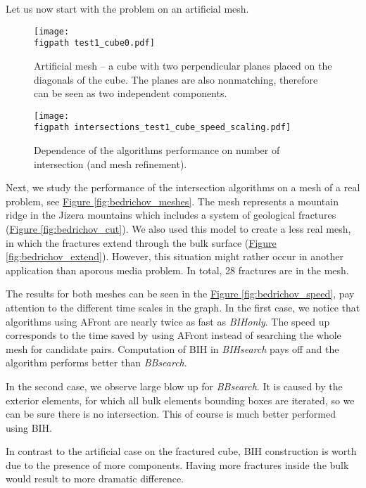 \documentclass{elsarticle}
\newcommand{\fig}[1]{\hyperref[#1]{Figure \ref{#1}}}
\newcommand{\figpath}{figures/}
\begin{document}
Let us now start with the problem on an artificial mesh. 

\begin{figure}[!htb]
    \centering
    \texttt{[image: \\figpath test1\_cube0.pdf]}
    \caption{Artificial mesh -- a cube with two perpendicular planes placed on the diagonals of the cube.
             The planes are also nonmatching, therefore can be seen as two independent components.}
    \label{fig:cube_mesh}
\end{figure}
  
\begin{figure}[!htb]
    \centering
    \texttt{[image: \\figpath intersections\_test1\_cube\_speed\_scaling.pdf]}
    \caption{Dependence of the algorithms performance on number of intersection (and mesh refinement). }
    \label{fig:cube_speed}
\end{figure}


Next, we study the performance of the intersection algorithms on a mesh of a real problem, see \fig{fig:bedrichov_meshes}. The mesh represents a mountain ridge in the Jizera mountains which 
includes a system of geological fractures (\fig{fig:bedrichov_cut}). We also used this model to create
a less real mesh, in which the fractures extend through the bulk surface (\fig{fig:bedrichov_extend}). 
However, this situation might rather occur in another application than aporous media problem.
In total, 28 fractures are in the mesh.

The results for both meshes can be seen in the \fig{fig:bedrichov_speed}, pay attention to the different time
scales in the graph. In the first case, we notice that algorithms using AFront are nearly twice as fast as \emph{BIHonly}. The speed up corresponds to the time saved by using AFront instead of searching the whole mesh for candidate pairs. Computation of BIH in \emph{BIHsearch} pays off and the algorithm performs better than \emph{BBsearch}.

In the second case, we observe large blow up for \emph{BBsearch}. It is caused by the exterior elements, 
for which all bulk elements bounding boxes are iterated, so we can be sure there is no intersection.
This of course is much better performed using BIH.

In contrast to the artificial case on the fractured cube, BIH construction is worth due
to the presence of more components. Having more fractures inside the bulk would result to more dramatic difference.
\end{document}
